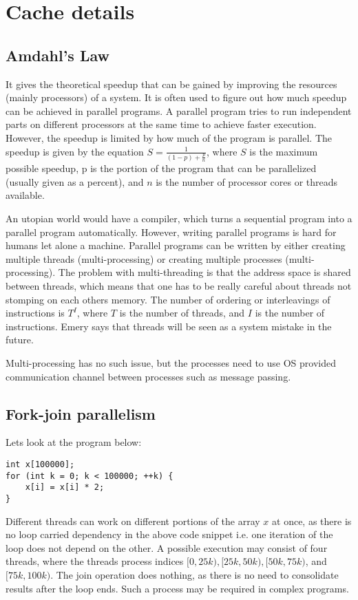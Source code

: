 \documentclass{article}
\begin{document}
\section*{Cache details}
\subsection*{Amdahl's Law}

It gives the theoretical speedup that can be gained by improving the resources (mainly processors) of a system.
It is often used to figure out how much speedup can be achieved in parallel programs.
A parallel program tries to run independent parts on different processors at the same time to achieve faster execution.
However, the speedup is limited by how much of the program is parallel.
The speedup is given by the equation $S = \frac{1}{(1-p) + \frac{p}{n}}$, where $S$ is the maximum possible speedup,
p is the portion of the program that can be parallelized (usually given as a percent), and $n$ is the number of processor
cores or threads available.

An utopian world would have a compiler, which turns a sequential program into a parallel program automatically.
However, writing parallel programs is hard for humans let alone a machine.
Parallel programs can be written by either creating multiple threads (multi-processing) or creating multiple
processes (multi-processing).
The problem with multi-threading is that the address space is shared between threads, which means that
one has to be really careful about threads not stomping on each others memory.
The number of ordering or interleavings of instructions is $T^I$, where $T$ is the number of threads,
and $I$ is the number of instructions.
Emery says that threads will be seen as a system mistake in the future.

Multi-processing has no such issue, but the processes need to use OS provided communication channel between
processes such as message passing.

\subsection*{Fork-join parallelism}
Lets look at the program below:

\begin{verbatim}
int x[100000];
for (int k = 0; k < 100000; ++k) {
    x[i] = x[i] * 2;
}
\end{verbatim}

Different threads can work on different portions of the array $x$ at once,
as there is no loop carried dependency in the above code snippet i.e. one iteration
of the loop does not depend on the other.
A possible execution may consist of four threads, where the threads process indices
$[0, 25k), [25k, 50k), [50k, 75k)$, and $[75k, 100k)$.
The join operation does nothing, as there is no need to consolidate results after the loop ends.
Such a process may be required in complex programs.
\end{document}
